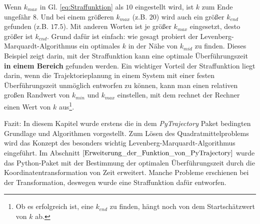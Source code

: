 \begin{beispiel}
	Wenn $k_{max}$ in Gl. \eqref{eq:Straffunktion} als $10$ eingestellt wird, ist $k$ zum Ende ungefähr $8$. Und bei einem größeren $k_{max}$ (z.B. $20$) wird auch ein größer $k_{end}$ gefunden (z.B. $17.5$). Mit anderen Worten ist je größer $k_{max}$ eingesetzt, desto größer ist $k_{end}$. Grund dafür ist einfach: wie gesagt probiert der Levenberg-Marquardt-Algorithmus ein optimales $k$ in der Nähe von $k_{mid}$ zu finden. Dieses Beispiel zeigt darin, mit der Straffunktion kann eine optimale Überführungszeit \textbf{in einem Bereich} gefunden werden. Ein wichtiger Vorteil der Straffunktion liegt darin, wenn die Trajektorieplanung in einem System mit einer festen Überführungszeit unmöglich entworfen zu können, kann man einen relativen großen Randwert von $k_{min}$ und $k_{max}$ einstellen, mit dem rechnet der Rechner einen Wert von $k$ aus\footnote{Ob es erfolgreich ist, eine $k_{end}$ zu finden, hängt noch von dem Startschätzwert von $k$ ab.}.
	
\end{beispiel}

Fazit: In diesem Kapitel wurde erstens die in dem \emph{PyTrajectory} Paket bedingten Grundlage und Algorithmen vorgestellt. Zum Lösen des Quadratmittelproblems wird das Konzept des besonders wichtig Levenberg-Marquardt-Algorithmus eingeführt. Im Abschnitt $\ref{Erweiterung_der_Funktion_von_PyTrajectory}$ wurde das Python-Paket mit der Bestimmung der optimalen Überführungszeit durch die Koordinatentransformation von Zeit erweitert. Manche Probleme erschienen bei der Transformation, deswegen wurde eine Straffunktion dafür entworfen.  
